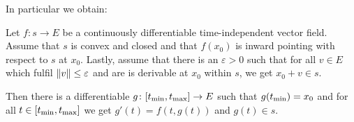 In particular we obtain: 

\begin{cor}
Let $f \colon s \to E$ be a continuously differentiable time-independent vector field. 
Assume that $s$ is convex and closed and that $f(x_0)$ is inward pointing with respect to $s$ at $x_0$. 
Lastly, assume that there is an $\varepsilon > 0$ such that for all $v \in E$ which fulfil $\left\lVert v\right\rVert \le \varepsilon$ and are is derivable at $x_0$ within $s$, we get $x_0 + v \in s$. 

Then there is a differentiable $g \colon [t_{\text{min}}, t_{\text{max}}] \to E$ such that $g (t_{\text{min}}) = x_0$ and for all $t \in [t_{\text{min}}, t_{\text{max}}]$ we get $g'(t) = f(t, g(t))$ and $g(t) \in s$. 
\end{cor}